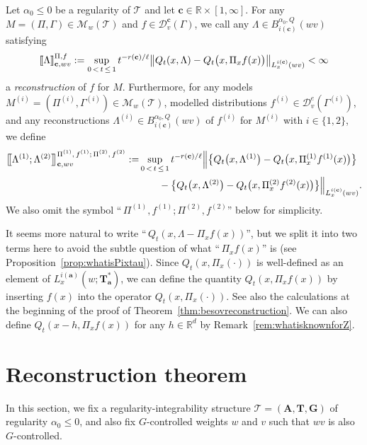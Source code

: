 \documentclass[AHL,Unicode,longabstracts,published]{cedram}
\newcommand{\bbR}{\mathbb{R}}
\newcommand{\bfa}{\mathbf{a}}
\newcommand{\bfc}{\mathbf{c}}
\newcommand{\bfA}{\mathbf{A}}
\newcommand{\bfT}{\mathbf{T}}
\newcommand{\bfG}{\mathbf{G}}
\newcommand{\mcD}{\mathcal{D}}
\newcommand{\scT}{\mathscr{T}}
\newcommand{\scM}{\mathscr{M}}
\newcommand{\llbracket}{\mathopen{[\mkern -2.7mu[}}
\newcommand{\rrbracket}{\mathclose{]\mkern -2.7mu]}}
\newcommand{\lb}{\llbracket}
\newcommand{\rb}{\rrbracket}
\newcommand{\llbigbracket}{\mathopen{\big[\mkern -4.2mu\big[}}
\newcommand{\rrbigbracket}{\mathclose{\big]\mkern -4.2mu\big]}}
\newcommand{\lbb}{\llbigbracket}
\newcommand{\rbb}{\rrbigbracket}
\begin{document}
\begin{defi}\label{def:besovreconst}
Let $\alpha_0\le0$ be a regularity of $\scT$ and let $\bfc\in\bbR\times[1,\infty]$. For any $M=(\Pi,\Gamma)\in\scM_{w}(\scT)$ and $f\in\mcD_{v}^\bfc(\Gamma)$, we call any $\Lambda\in B_{i(\bfc)}^{\alpha_0,Q}(wv)$ satisfying
\begin{align*}
\lb\Lambda\rb_{\bfc,wv}^{\Pi,f}:=\sup_{0\,<\,t\,\le\,1}t^{-r(\bfc)/\ell}\big\|Q_t(x,\Lambda)-Q_t\big(x,\Pi_xf(x)\big)\big\|_{L_x^{i(\bfc)}(wv)}<\infty
\end{align*}
a \emph{reconstruction} of $f$ for $M$. Furthermore, for any models $M^{(i)}=(\Pi^{(i)},\Gamma^{(i)})\in\scM_{w}(\scT)$, modelled distributions $f^{(i)}\in\mcD_{v}^e(\Gamma^{(i)})$, and any reconstructions $\Lambda^{(i)}\in B_{i(\bfc)}^{\alpha_0,Q}(wv)$ of $f^{(i)}$ for $M^{(i)}$ with $i\in\{1,2\}$, we define
\begin{align*}
\lbb\Lambda^{(1)};\Lambda^{(2)}\rbb_{\bfc,wv}^{\Pi^{(1)},\,f^{(1)};\,\Pi^{(2)},\,f^{(2)}} :=&\sup_{0\,<\,t\,\le\,1}t^{-r(\bfc)/\ell}\Big\|\big\{Q_t\big(x,\Lambda^{(1)}\big)-Q_t\big(x,\Pi_x^{(1)}f^{(1)}(x)\big)\big\}\\
&\qquad-\big\{Q_t\big(x,\Lambda^{(2)}\big)-Q_t\big(x,\Pi_x^{(2)}f^{(2)}(x)\big)\big\}\Big\|_{L_x^{i(\bfc)}(wv)}.
\end{align*}
We also omit the symbol ``$\,\Pi^{(1)},f^{(1)};\Pi^{(2)},f^{(2)}$'' below for simplicity.
\end{defi}

\begin{rema}\label{rem:L-Pixfx}
It seems more natural to write ``$\, Q_t(x,\Lambda-\Pi_xf(x))$'', but we split it into two terms here to avoid the subtle question of what ``$\, \Pi_xf(x)$'' is (see Proposition~\ref{prop:whatisPixtau}). Since $Q_t(x,\Pi_x(\cdot))$ is well-defined as an element of $L_x^{i(\bfa)}(w;\bfT_\bfa^*)$, we can define the quantity $Q_t(x,\Pi_xf(x))$ by inserting $f(x)$ into the operator $Q_t(x,\Pi_x(\cdot))$. See also the calculations at the beginning of the proof of Theorem~\ref{thm:besovreconstruction}. We can also define $Q_t(x-h,\Pi_xf(x))$ for any $h\in\bbR^d$ by Remark~\ref{rem:whatisknownforZ}.
\end{rema}

\section{Reconstruction theorem}\label{section:reconstruction}


In this section, we fix a regularity-integrability structure $\scT=(\bfA,\bfT,\bfG)$ of regularity $\alpha_0\le0$, and also fix $G$-controlled weights $w$ and $v$ such that $wv$ is also $G$-controlled.
\end{document}
